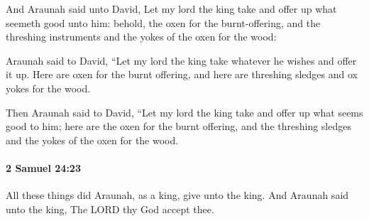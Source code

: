 			\begin{versebox}
					\item[BHS] 
					\item[ASV] And Araunah said unto David, Let my lord the king take and offer up what seemeth good unto him: behold, the oxen for the burnt-offering, and the threshing instruments and the yokes of the oxen for the wood:
					\item[NIV] Araunah said to David, “Let my lord the king take whatever he wishes and offer it up. Here are oxen for the burnt offering, and here are threshing sledges and ox yokes for the wood.
					\item[NRSV] Then Araunah said to David, “Let my lord the king take and offer up what seems good to him; here are the oxen for the burnt offering, and the threshing sledges and the yokes of the oxen for the wood.
			\end{versebox}

		\paragraph{2 Samuel 24:23} %
			\label{2SAMUEL-24-23}

			All these things did Araunah, as a king, give unto the king. And Araunah said unto the king, The LORD thy God accept thee.

